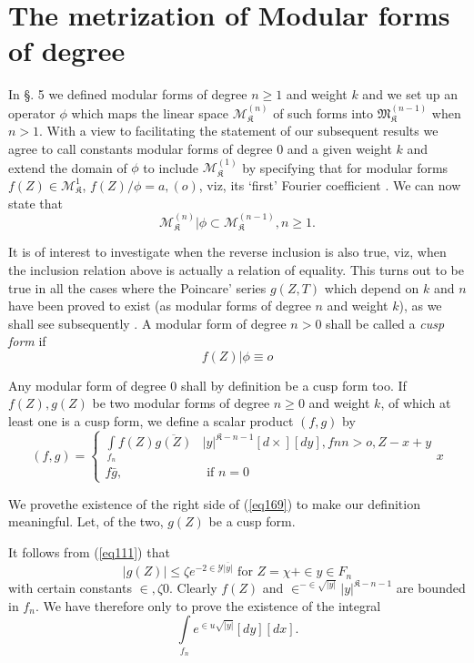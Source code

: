 \chapter{The metrization of Modular forms of degree}%

In \pageoriginale \S. 5 we defined modular forms of degree  $n \ge
1$ and weight 
$k$ and we set up an operator $\phi$ which maps the linear space
$\mathscr{M}^{(n)}_{\mathfrak{K}}$  of such forms into $
\mathfrak{M}^{(n-1)}_{\mathfrak{K}}$ when $n >1$. With a view to
facilitating the statement of our subsequent results we agree to call
constants modular  forms of degree 0 and a given weight $k$ and
extend the domain of $\phi$ to include
$\mathscr{M}^{(1)}_{\mathfrak{K}}$ by  specifying that for modular
forms $f(Z) \in \mathscr{M}^1_{\mathfrak{K}}$, $f (Z) / \phi = a,
(o)$, viz, its `first'  Fourier coefficient . We can now state that  
$$ 
\mathscr{M}^{(n)}_{\mathfrak{K}} \bigg | \phi \subset
\mathscr{M}^{(n-1)}_{\mathfrak{K}} , n \ge 1. 
$$

It is of interest to investigate when the reverse inclusion is also
true, viz, when the inclusion relation above is actually a relation
of  equality. This turns  out to be true in all the cases where the
Poincare'  series  $g(Z,T)$ which depend on $k$ and $n$ have been
proved to exist  (as modular forms of degree  $n$ and weight $k$), as
we shall see  subsequently . A modular form of degree $n > 0$ shall be
called a  \textit{cusp form} if  
$$
f(Z)|  \phi \equiv o
$$  

Any modular form of degree $0$ shall by definition be a cusp form
too. If  $f(Z), g(Z)$ be two  modular forms of degree  $n \ge 0$ and
weight $k$, of which  at least one is a cusp form, we define a scalar
product $(f, g)$ by   
\begin{equation*}
(f, g) =
\begin{cases}
\int\limits_{f_n} f(Z) \overline{g(Z)} & |y| ^{\mathfrak{K}-n-1} [ d \times ]
    [d y] , f n  n > o, Z-x+y\\ 
f \bar{g},  & \text{ if  } n =0  \tag{169}\label{eq169}
\end{cases}x
\end{equation*}

We prove\pageoriginale  the existence  of the right  side of
(\ref{eq169}) to make our 
definition  meaningful. Let, of the two, $g(Z)$ be a cusp form. 

It follows from (\ref{eq111}) that 
$$
|g(Z) | \le \zeta e^{-2 \in \mathscr{Y} \overline{|y|}}  \text{ for } 
Z=  \chi + \in y \in F_n
$$
with certain  constants $\in, \zeta  0$. Clearly $f(Z)$ and $\in^{-\in
  \sqrt{| y|} } |y|^{\mathfrak{K}-n-1}$ are boun\-ded in $f_n$. We have
therefore only to prove the  existence of the integral  
$$
\int\limits_{f_{n}} e^{\in u \sqrt{|y|}} [d y] [d x].
$$


